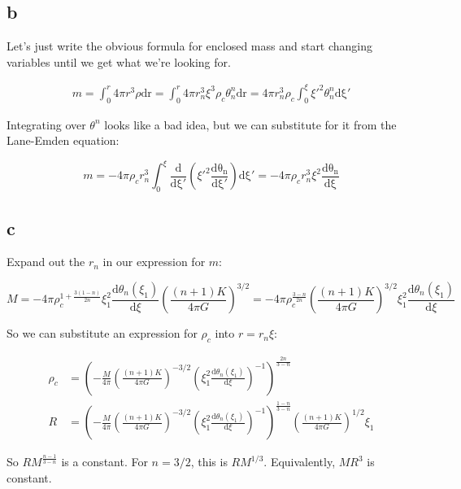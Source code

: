 \documentclass[12pt]{article}
\newcommand{\pfrac}[2]{\left(\frac{#1}{#2} \right)}
\begin{document}
\subsection*{b}

Let's just write the obvious formula for enclosed mass and start changing variables until we get what we're looking for.

\begin{align*}
m = \int_0^r 4\pi r^3\rho\mathrm{dr} = \int_0^{r}4\pi r_n^3 \xi^3 \rho_c \theta^n_n \mathrm{dr} = 4\pi r_n^3 \rho_c\int_0^{\xi}\xi'^2\theta_n^n\mathrm{d\xi'}
\end{align*}

Integrating over \(\theta^n\) looks like a bad idea, but we can substitute for it from the Lane-Emden equation:

\[ m = -4\pi \rho_c r_n^3 \int_0^{\xi} \frac{\mathrm{d}}{\mathrm{d\xi'}}\left(\xi'^2\frac{\mathrm{d\theta_n}}{\mathrm{d\xi'}} \right)\mathrm{d\xi'} = -4\pi\rho_c r_n^3 \xi^2 \frac{\mathrm{d\theta_n}}{\mathrm{d\xi}}
\]

\subsection*{c}

Expand out the \(r_n\) in our expression for \(m\):

\[ M = -4\pi\rho_c^{1+\frac{3(1-n)}{2n}}\xi_1^2 \frac{\mathrm{d}\theta_n(\xi_1)}{\mathrm{d}\xi} \left( \frac{(n+1)K}{4\pi G} \right)^{3/2} = -4\pi\rho_c^{\frac{3-n}{2n}} \left( \frac{(n+1)K}{4\pi G} \right)^{3/2}\xi_1^2\frac{\mathrm{d}\theta_n(\xi_1)}{\mathrm{d}\xi}
\]

So we can substitute an expression for \(\rho_c\) into \(r=r_n \xi\):

\begin{align*}
\rho_c &= \left(-\frac{M}{4\pi}\left(\frac{(n+1)K}{4\pi G}\right)^{-3/2}\left(\xi_1^2\frac{\mathrm{d}\theta_n(\xi_1)}{\mathrm{d}\xi}\right)^{-1}\right)^{\frac{2n}{3-n}}\\
R &= \left(-\frac{M}{4\pi}\left(\frac{(n+1)K}{4\pi G}\right)^{-3/2}\left(\xi_1^2\frac{\mathrm{d}\theta_n(\xi_1)}{\mathrm{d}\xi}\right)^{-1}\right)^{\frac{1-n}{3-n}} \pfrac{(n+1)K}{4\pi G}^{1/2} \xi_1
\end{align*}

So \(RM^{\frac{n-1}{3-n}}\) is a constant. For \(n=3/2\), this is \(RM^{1/3}\). Equivalently, \(MR^3\) is constant.
\end{document}
